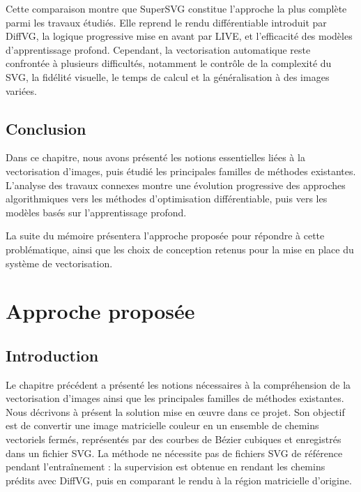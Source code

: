 \documentclass[12pt, a4paper, oneside]{report}
\begin{document}
Cette comparaison montre que SuperSVG constitue l'approche la plus complète parmi les travaux étudiés. Elle reprend le rendu différentiable introduit par DiffVG, la logique progressive mise en avant par LIVE, et l'efficacité des modèles d'apprentissage profond. Cependant, la vectorisation automatique reste confrontée à plusieurs difficultés, notamment le contrôle de la complexité du SVG, la fidélité visuelle, le temps de calcul et la généralisation à des images variées.

\section{Conclusion}

Dans ce chapitre, nous avons présenté les notions essentielles liées à la vectorisation d'images, puis étudié les principales familles de méthodes existantes. L'analyse des travaux connexes montre une évolution progressive des approches algorithmiques vers les méthodes d'optimisation différentiable, puis vers les modèles basés sur l'apprentissage profond.

La suite du mémoire présentera l'approche proposée pour répondre à cette problématique, ainsi que les choix de conception retenus pour la mise en place du système de vectorisation.

\chapter{Approche proposée}
\label{chap:approche_proposee}

\section{Introduction}

Le chapitre précédent a présenté les notions nécessaires à la compréhension de la vectorisation d'images ainsi que les principales familles de méthodes existantes. Nous décrivons à présent la solution mise en œuvre dans ce projet. Son objectif est de convertir une image matricielle couleur en un ensemble de chemins vectoriels fermés, représentés par des courbes de Bézier cubiques et enregistrés dans un fichier SVG. La méthode ne nécessite pas de fichiers SVG de référence pendant l'entraînement : la supervision est obtenue en rendant les chemins prédits avec DiffVG, puis en comparant le rendu à la région matricielle d'origine.
\end{document}

